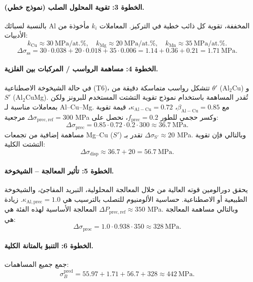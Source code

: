 \documentclass[11pt,a4paper]{article}
\begin{document}
\begin{otherlanguage}{arabic}
		\paragraph{الخطوة 3: تقوية المحلول الصلب (نموذج خطي).}
		بالنسبة لسبائك Al المخففة، تقوية كل ذائب خطية في التركيز. المعاملات \(k_i\) مأخوذة من الأدبيات:
		\[
		k_{\mathrm{Cu}} \approx 30\ \text{MPa/at.\%},\quad
		k_{\mathrm{Mg}} \approx 20\ \text{MPa/at.\%},\quad
		k_{\mathrm{Mn}} \approx 35\ \text{MPa/at.\%}.
		\]
		\[
		\Delta\sigma_{\mathrm{ss}} = 30\cdot0.038 + 20\cdot0.018 + 35\cdot0.006
		= 1.14 + 0.36 + 0.21 = 1.71\ \text{MPa}.
		\]
		
		\paragraph{الخطوة 4: مساهمة الرواسب / المركبات بين الفلزية.}
		في حالة الشيخوخة الاصطناعية (T6)، تتشكل رواسب متماسكة دقيقة من \(\theta'\) (Al\(_2\)Cu) و \(S'\) (Al\(_2\)CuMg). تُقدر المساهمة باستخدام نموذج تقوية التشتت المستخدم للبرونز ولكن بمعاملات مناسبة لـ Al–Cu–Mg. مع \(\beta_{\mathrm{Al-Cu}}=0.85\)، \(\kappa_{\mathrm{Al-Cu}}=0.72\)، قيمة تقوية مرجعية \(\Delta\sigma_{\mathrm{prec,ref}}=300\) MPa وكسر حجمي للطور \(f_{\mathrm{prec}}=0.2\)، نحصل على:
		\[
		\Delta\sigma_{\mathrm{prec}} = 0.85\cdot0.72\cdot0.2\cdot300 \approx 36.7\ \text{MPa}.
		\]
		مساهمة إضافية من تجمعات Mg–Cu (\(S'\)) تقدر بـ \(\Delta\sigma_{\mathrm{S'}} \approx 20\) MPa. وبالتالي فإن تقوية التشتت الكلية:
		\[
		\Delta\sigma_{\mathrm{disp}} \approx 36.7 + 20 = 56.7\ \text{MPa}.
		\]
		
		\paragraph{الخطوة 5: تأثير المعالجة – الشيخوخة.}
		يحقق دورالومين قوته العالية من خلال المعالجة المحلولية، التبريد المفاجئ، والشيخوخة الطبيعية أو الاصطناعية. حساسية الألومنيوم للتصلب بالترسيب هي \(\kappa_{\mathrm{Al,prec}}=1.0\). زيادة المعالجة الأساسية لهذه الفئة هي \(\Delta P_{\mathrm{prec,ref}}\approx 350\) MPa. وبالتالي مساهمة المعالجة هي:
		\[
		\Delta\sigma_{\mathrm{proc}} = 1.0\cdot0.938\cdot350 \approx 328\ \text{MPa}.
		\]
		
		\paragraph{الخطوة 6: التنبؤ بالمتانة الكلية.}
		جمع جميع المساهمات:
		\[
		\sigma_B^{\mathrm{pred}} = 55.97 + 1.71 + 56.7 + 328 \approx 442\ \text{MPa}.
		\]
		

\end{otherlanguage}
\end{document}
